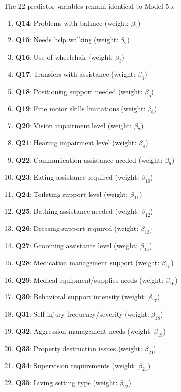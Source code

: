 The 22 predictor variables remain identical to Model 5b:
\begin{enumerate}
    \item \textbf{Q14}: Problems with balance (weight: $\beta_1$)
    \item \textbf{Q15}: Needs help walking (weight: $\beta_2$)
    \item \textbf{Q16}: Use of wheelchair (weight: $\beta_3$)
    \item \textbf{Q17}: Transfers with assistance (weight: $\beta_4$)
    \item \textbf{Q18}: Positioning support needed (weight: $\beta_5$)
    \item \textbf{Q19}: Fine motor skills limitations (weight: $\beta_6$)
    \item \textbf{Q20}: Vision impairment level (weight: $\beta_7$)
    \item \textbf{Q21}: Hearing impairment level (weight: $\beta_8$)
    \item \textbf{Q22}: Communication assistance needed (weight: $\beta_9$)
    \item \textbf{Q23}: Eating assistance required (weight: $\beta_{10}$)
    \item \textbf{Q24}: Toileting support level (weight: $\beta_{11}$)
    \item \textbf{Q25}: Bathing assistance needed (weight: $\beta_{12}$)
    \item \textbf{Q26}: Dressing support required (weight: $\beta_{13}$)
    \item \textbf{Q27}: Grooming assistance level (weight: $\beta_{14}$)
    \item \textbf{Q28}: Medication management support (weight: $\beta_{15}$)
    \item \textbf{Q29}: Medical equipment/supplies needs (weight: $\beta_{16}$)
    \item \textbf{Q30}: Behavioral support intensity (weight: $\beta_{17}$)
    \item \textbf{Q31}: Self-injury frequency/severity (weight: $\beta_{18}$)
    \item \textbf{Q32}: Aggression management needs (weight: $\beta_{19}$)
    \item \textbf{Q33}: Property destruction issues (weight: $\beta_{20}$)
    \item \textbf{Q34}: Supervision requirements (weight: $\beta_{21}$)
    \item \textbf{Q35}: Living setting type (weight: $\beta_{22}$)
\end{enumerate}

